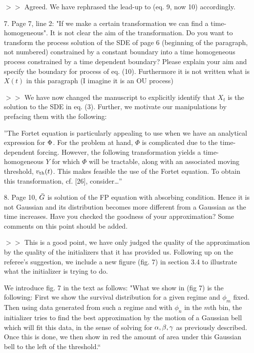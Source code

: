 \documentclass{article}
\begin{document}
$>>$ Agreed. We have rephrased the lead-up to (eq. 9, now 10) accordingly.


\vskip 10pt
7. Page 7, line 2: "If we make a certain transformation we can find
a time- homogeneous". It is not clear the aim of the transformation. Do you
want to transform the process solution of the SDE of page 6 (beginning of
the paragraph, not numbered) constrained by a constant boundary into
a time homogeneous process constrained by a time dependent boundary?
Please explain your aim and specify the boundary for process of eq. (10).
Furthermore it is not written what is $X (t)$ in this paragraph (I imagine
it is an OU process)

$>>$ We have now changed the manuscript to explicitly identify that $X_t$ is
the solution to the SDE in eq. (3). Further, we motivate our manipulations by
prefacing them with the following:

''The Fortet equation is particularly appealing to use when we have an analytical
expression for ${\Phi}$. For the problem at hand, $\Phi$ is complicated
due to the time-dependent forcing. However, the following transformation yields
a time-homogeneous $Y$ for which $\Phi$ will be tractable, along with an associated
moving threshold, ${ v_{\textrm{th} } }(t)$. This makes feasible
the use of the Fortet equation. To obtain this transformation, cf. [26], consider\ldots ''

\vskip 10pt

8. Page 10, ${ \bar{G} }$ is solution of the FP equation with absorbing condition. Hence
it is not Gaussian and its distribution becomes more different from a
Gaussian as the time increases. Have you checked the goodness of your
approximation? Some comments on this point should be added.

$>>$ This is a good point, we have only judged the quality of the
approximation by the quality of the initializers that it has provided us.
Following up on the referee's suggestion, we include a new figure (fig. 7) in
section 3.4 to illustrate what the initializer is trying to do.

We introduce fig. 7 in the text as follows: "What we show in (fig 7) is the
following: First we show the survival distribution for a given regime and
$\phi_m$ fixed. Then using data generated from such a regime and with $\phi_n$
in the $m$th bin, the initializer tries to find the best approximation by the
motion of a Gaussian bell which will fit this data, in the sense of solving for
${\alpha},{\beta},{\gamma }$ as previously described. Once this is done, we then show in red the
amount of area under this Gaussian bell to the left of the threshold.``
\end{document}
